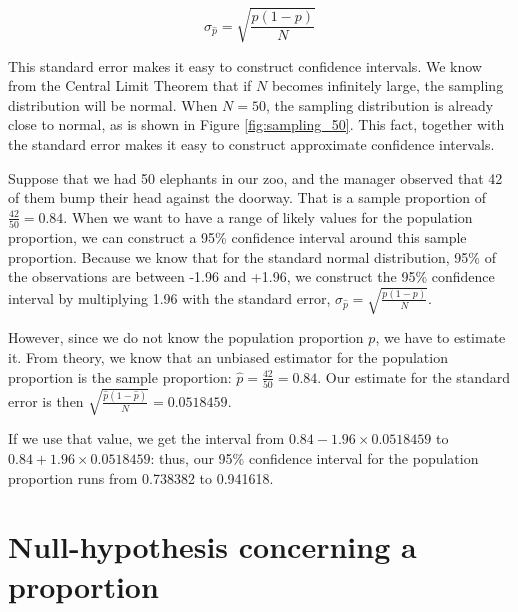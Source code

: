 \begin{equation}
\sigma_{\hat{p}} = \sqrt{\frac{p(1-p)}{N}}
\end{equation}

This standard error makes it easy to construct confidence intervals. We know from the Central Limit Theorem that if $N$ becomes infinitely large, the sampling distribution will be normal. When $N=50$, the sampling distribution is already close to normal, as is shown in Figure \ref{fig:sampling_50}. This fact, together with the standard error makes it easy to construct approximate confidence intervals.


Suppose that we had 50 elephants in our zoo, and the manager observed that 42 of them bump their head against the doorway. That is a sample proportion of $\frac{42}{50}= 0.84$. When we want to have a range of likely values for the population proportion, we can construct a 95\% confidence interval around this sample proportion. Because we know that for the standard normal distribution, 95\% of the observations are between -1.96 and +1.96, we construct the 95\% confidence interval by multiplying 1.96 with the standard error, $\sigma_{\hat{p}} = \sqrt{\frac{p(1-p)}{N}}$.


However, since we do not know the population proportion $p$, we have to estimate it. From theory, we know that an unbiased estimator for the population proportion is the sample proportion: $\hat{p} = \frac{42}{50}= 0.84$. Our estimate for the standard error is then $\sqrt{\frac{\hat{p}(1-\hat{p})}{N}} = 0.0518459$.

If we use that value, we get the interval from $0.84 - 1.96 \times 0.0518459$ to $0.84 + 1.96 \times 0.0518459$: thus, our 95\% confidence interval for the population proportion runs from 0.738382 to 0.941618.



\begin{knitrout}
\color{fgcolor}\begin{kframe}


{\ttfamily\noindent\bfseries{}}\end{kframe}
\end{knitrout}


\section{Null-hypothesis concerning a proportion}

